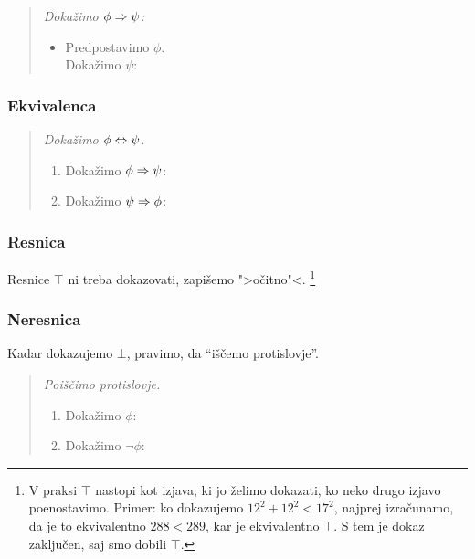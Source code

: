 \begin{quote}
  \sl
  Dokažimo $\phi \Rightarrow \psi$:
  \begin{itemize}
  \item[] Predpostavimo $\phi$. \\
        Dokažimo $\psi$: \quad {}
  \end{itemize}
\end{quote}

\subsubsection{Ekvivalenca}

\begin{quote}
  \sl
  Dokažimo $\phi \Leftrightarrow \psi$.
  \begin{enumerate}
  \item Dokažimo $\phi \Rightarrow \psi$: \quad {}
  \item Dokažimo $\psi \Rightarrow \phi$: \quad {}
  \end{enumerate}
\end{quote}

\subsubsection{Resnica}

Resnice $\top$ ni treba dokazovati, zapišemo ">očitno"<. \footnote{
V praksi $\top$ nastopi kot izjava, ki jo želimo dokazati, ko neko drugo izjavo poenostavimo. Primer: ko dokazujemo
$12^2 + 12^2 < 17^2$, najprej izračunamo, da je to ekvivalentno $288 < 289$, kar je ekvivalentno $\top$. S tem je dokaz
zaključen, saj smo dobili $\top$.}

\subsubsection{Neresnica}

Kadar dokazujemo $\bot$, pravimo, da ``iščemo protislovje''.

\begin{quote}
  \sl
  Poiščimo protislovje.
  \begin{enumerate}
  \item Dokažimo $\phi$: \quad {}
  \item Dokažimo $\lnot \phi$: \quad {}
  \end{enumerate}
\end{quote}

